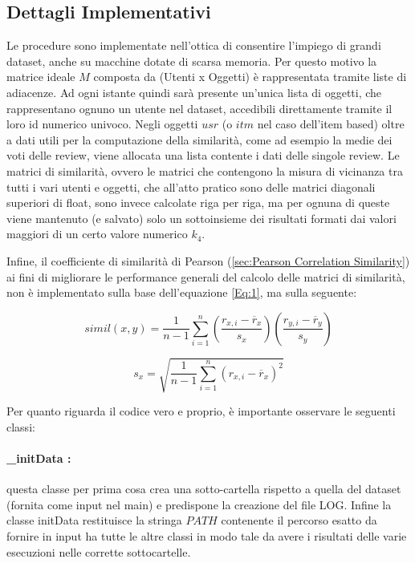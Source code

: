 \documentclass[12pt]{article}
\begin{document}
\subsection{Dettagli Implementativi}
Le procedure sono implementate nell'ottica di consentire l'impiego di grandi dataset, anche su macchine dotate di scarsa memoria. Per questo motivo la matrice ideale $M$ composta da (Utenti x Oggetti) è rappresentata tramite liste di adiacenze. Ad ogni istante quindi sarà presente un'unica lista di oggetti, che rappresentano ognuno un utente nel dataset, accedibili direttamente tramite il loro id numerico univoco. Negli oggetti \textbf{$usr$} (o \textbf{$itm$} nel caso dell'item based) oltre a dati utili per la computazione della similarità, come ad esempio la medie dei voti delle review, viene allocata una lista contente i dati delle singole review.
Le matrici di similarità, ovvero le matrici che contengono la misura di vicinanza tra tutti i vari utenti e oggetti, che all'atto pratico sono delle matrici diagonali superiori di float, sono invece calcolate riga per riga, ma per ognuna di queste viene mantenuto (e salvato) solo un sottoinsieme dei risultati formati dai valori maggiori di un certo valore numerico $k_4$.

Infine,  il coefficiente di similarità di Pearson (\ref{sec:Pearson Correlation Similarity}) ai fini di migliorare le performance generali del calcolo delle matrici di similarità, non è implementato sulla base dell'equazione \ref{Eq:1}, ma sulla seguente:

\begin{equation}
simil(x,y) = \frac{1}{n-1}\sum_{i=1}^{n}(\frac{r_{x,i}-\overline{r}_x}{s_x})(\frac{r_{y,i}-\overline{r}_y}{s_y})
\end{equation}



\begin{equation}
s_x = \sqrt{\frac{1}{n-1}\sum_{i=1}^{n}(r_{x,i}-\overline{r}_x)^2}
\label{Eq:3}
\end{equation}


Per quanto riguarda il codice vero e proprio, è importante osservare le seguenti classi:
\paragraph{\_initData :} questa classe per prima cosa crea una sotto-cartella rispetto a quella del dataset (fornita come input nel main) e predispone la creazione del file LOG. Infine la classe initData restituisce la stringa $PATH$ contenente il percorso esatto da fornire in input ha tutte le altre classi in modo tale da avere i risultati delle varie esecuzioni nelle corrette sottocartelle.
\end{document}
